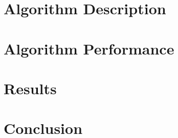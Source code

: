 \documentclass[conference,letterpaper]{IEEEtran}
\begin{document}
\section{Algorithm Description}

\section{Algorithm Performance}

\section{Results}

\section{Conclusion}

\clearpage




%
%
\end{document}
